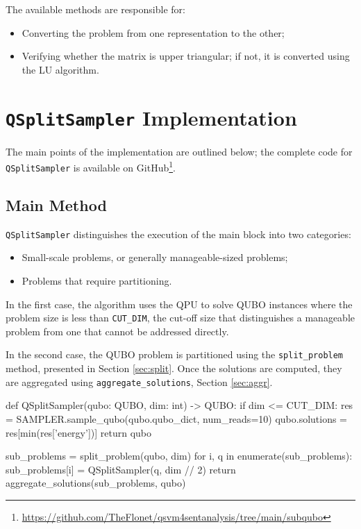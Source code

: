The available methods are responsible for:
\begin{itemize} 
	\item Converting the problem from one representation to the other; 
	\item Verifying whether the matrix is upper triangular; if not, it is converted using the LU algorithm\cite{LU}.
\end{itemize}

\section{\texttt{QSplitSampler} Implementation}

The main points of the implementation are outlined below; the complete code for \texttt{QSplitSampler} is available on GitHub\footnote{\url{https://github.com/TheFlonet/qsvm4sentanalysis/tree/main/subqubo}}.

\subsection{Main Method}

\texttt{QSplitSampler} distinguishes the execution of the main block into two categories: 
\begin{itemize} 
	\item Small-scale problems, or generally manageable-sized problems; 
	\item Problems that require partitioning. 
\end{itemize}

In the first case, the algorithm uses the QPU to solve QUBO instances where the problem size is less than \texttt{CUT\_DIM}, the cut-off size that distinguishes a manageable problem from one that cannot be addressed directly.

In the second case, the QUBO problem is partitioned using the \texttt{split\_problem} method, presented in Section \ref{sec:split}. 
Once the solutions are computed, they are aggregated using \texttt{aggregate\_solutions}, Section \ref{sec:aggr}.

\begin{python}
def QSplitSampler(qubo: QUBO, dim: int) -> QUBO:
    if dim <= CUT_DIM:
        res = SAMPLER.sample_qubo(qubo.qubo_dict, num_reads=10)
        qubo.solutions = res[min(res['energy'])]
        return qubo

    sub_problems = split_problem(qubo, dim)
    for i, q in enumerate(sub_problems):
        sub_problems[i] = QSplitSampler(q, dim // 2)
    return aggregate_solutions(sub_problems, qubo)
\end{python}

